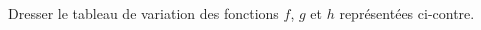 
\begin{exercice}\label{exoSeconde-0072}


%   

    \begin{multicols}{2}
        \begin{center}
            
        \end{center}

        \columnbreak

    Dresser le tableau de variation des fonctions \( f\), \( g\) et \( h\) représentées ci-contre.

    \end{multicols}

\end{exercice}
